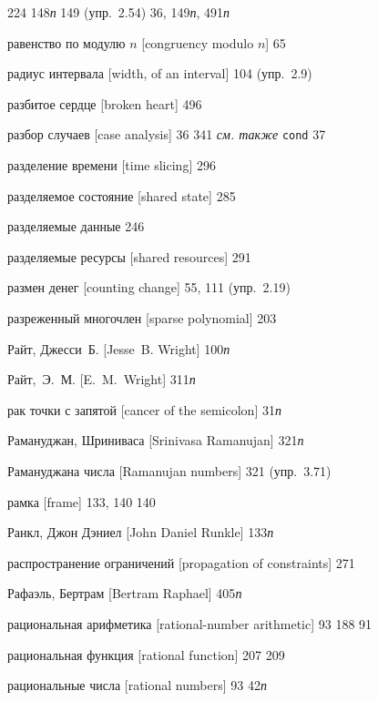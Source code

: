 \begin{theindex}
   224
   148{\it п}
   149 (упр.~2.54)
   36, 149{\it п}, 491{\it п}
\item {равенство по модулю $n$ [congruency modulo $n$]} 65
\item {радиус интервала [width, of an interval]} 104 (упр.~2.9)
\item {разбитое сердце [broken heart]} 496
\item {разбор случаев [case analysis]} 36
   341
   {\it см. также} \texttt{cond}
   37
\item {разделение времени [time slicing]} 296
\item {разделяемое состояние [shared state]} 285
\item {разделяемые данные} 246
\item {разделяемые ресурсы [shared resources]} 291
\item {размен денег [counting change]} 55, 111 (упр.~2.19)
\item {разреженный многочлен [sparse polynomial]} 203
\item {Райт, Джесси~Б. [Jesse~B. Wright]} 100{\it п}
\item {Райт,~Э.~М. [E.~M.~Wright]} 311{\it п}
\item {рак точки с запятой [cancer of the semicolon]} 31{\it п}
\item {Рамануджан, Шриниваса [Srinivasa Ramanujan]} 321{\it п}
\item {Рамануджана числа [Ramanujan numbers]} 321 (упр.~3.71)
\item {рамка [frame]} 133, 140
   140
\item {Ранкл, Джон Дэниел [John Daniel Runkle]} 133{\it п}
\item {распространение ограничений [propagation of constraints]} 271
\item {Рафаэль, Бертрам [Bertram Raphael]} 405{\it п}
\item {рациональная арифметика [rational-number arithmetic]} 93
   188
   91
\item {рациональная функция [rational function]} 207
   209
\item {рациональные числа [rational numbers]}
   93
   42{\it п}

\end{theindex}
